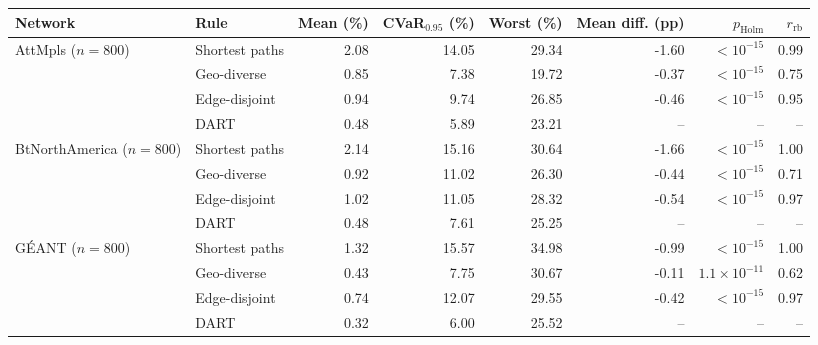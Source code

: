 \begin{tabular}{llrrrrrr}
\toprule
Network & Rule & Mean (\%) & CVaR$_{0.95}$ (\%) & Worst (\%) & Mean diff. (pp) & $p_{\mathrm{Holm}}$ & $r_{\mathrm{rb}}$ \\
\midrule
\multirow{4}{*}{AttMpls ($n=800$)} & Shortest paths & 2.08 & 14.05 & 29.34 & -1.60 & $<10^{-15}$ & 0.99 \\
 & Geo-diverse & 0.85 & 7.38 & 19.72 & -0.37 & $<10^{-15}$ & 0.75 \\
 & Edge-disjoint & 0.94 & 9.74 & 26.85 & -0.46 & $<10^{-15}$ & 0.95 \\
 & DART & 0.48 & 5.89 & 23.21 & -- & -- & -- \\
\midrule
\multirow{4}{*}{BtNorthAmerica ($n=800$)} & Shortest paths & 2.14 & 15.16 & 30.64 & -1.66 & $<10^{-15}$ & 1.00 \\
 & Geo-diverse & 0.92 & 11.02 & 26.30 & -0.44 & $<10^{-15}$ & 0.71 \\
 & Edge-disjoint & 1.02 & 11.05 & 28.32 & -0.54 & $<10^{-15}$ & 0.97 \\
 & DART & 0.48 & 7.61 & 25.25 & -- & -- & -- \\
\midrule
\multirow{4}{*}{G\'EANT ($n=800$)} & Shortest paths & 1.32 & 15.57 & 34.98 & -0.99 & $<10^{-15}$ & 1.00 \\
 & Geo-diverse & 0.43 & 7.75 & 30.67 & -0.11 & $1.1\times10^{-11}$ & 0.62 \\
 & Edge-disjoint & 0.74 & 12.07 & 29.55 & -0.42 & $<10^{-15}$ & 0.97 \\
 & DART & 0.32 & 6.00 & 25.52 & -- & -- & -- \\
\bottomrule
\end{tabular}
